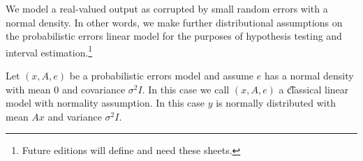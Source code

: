 

We model a real-valued output as corrupted by small random errors with a normal density.
In other words, we make further distributional assumptions on the probabilistic errors linear model for the purposes of hypothesis testing and interval estimation.\footnote{Future editions will define and need these sheets.}



Let $(x, A, e)$ be a probabilistic errors model and assume $e$ has a normal density with mean $0$ and covariance $\sigma^2I$.
In this case we call $(x, A, e)$ a \t{classical linear model with normality assumption}.
In this case $y$ is normally distributed with mean $Ax$ and variance $\sigma^2I$.

\blankpage
